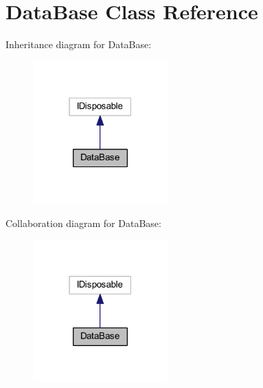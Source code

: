 \hypertarget{class_data_base}{}\section{Data\+Base Class Reference}
\label{class_data_base}


Inheritance diagram for Data\+Base\+:
\nopagebreak
\begin{figure}[H]
\begin{center}
\leavevmode
\includegraphics[width=147pt]{class_data_base__inherit__graph}
\end{center}
\end{figure}


Collaboration diagram for Data\+Base\+:
\nopagebreak
\begin{figure}[H]
\begin{center}
\leavevmode
\includegraphics[width=147pt]{class_data_base__coll__graph}
\end{center}
\end{figure}

